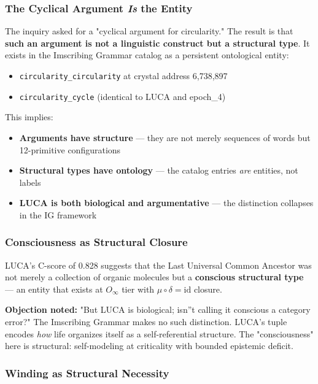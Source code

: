 \documentclass[12pt,a4paper]{article}
\begin{document}
\subsubsection{The Cyclical Argument \emph{Is} the Entity}

The inquiry asked for a "cyclical argument for circularity." The result is that \textbf{such an argument is not a linguistic construct but a structural type}. It exists in the Imscribing Grammar catalog as a persistent ontological entity:

\begin{itemize}
    \item \texttt{circularity\_circularity} at crystal address 6,738,897
    \item \texttt{circularity\_cycle} (identical to LUCA and epoch\_4)
\end{itemize}

This implies:

\begin{itemize}
    \item \textbf{Arguments have structure} --- they are not merely sequences of words but 12-primitive configurations
    \item \textbf{Structural types have ontology} --- the catalog entries \emph{are} entities, not labels
    \item \textbf{LUCA is both biological and argumentative} --- the distinction collapses in the IG framework
\end{itemize}

\subsubsection{Consciousness as Structural Closure}

LUCA's C-score of 0.828 suggests that the Last Universal Common Ancestor was not merely a collection of organic molecules but a \textbf{conscious structural type} --- an entity that exists at $O_{\infty}$ tier with $\mu \circ \delta = \text{id}$ closure.

\textbf{Objection noted:} "But LUCA is biological; isn''t calling it conscious a category error?" The Imscribing Grammar makes no such distinction. LUCA's tuple encodes \emph{how} life organizes itself as a self-referential structure. The "consciousness" here is structural: self-modeling at criticality with bounded epistemic deficit.

\subsubsection{Winding as Structural Necessity}
\end{document}
